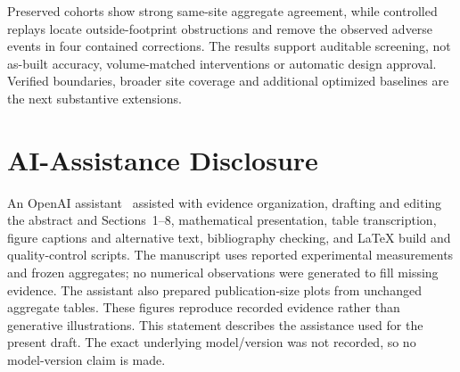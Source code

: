 \documentclass{llncs}
\begin{document}
Preserved cohorts show strong same-site aggregate agreement, while controlled replays locate outside-footprint obstructions and remove the observed adverse events in four contained corrections. The results support auditable screening, not as-built accuracy, volume-matched interventions or automatic design approval. Verified boundaries, broader site coverage and additional optimized baselines are the next substantive extensions.

\section*{AI-Assistance Disclosure}
An OpenAI assistant~\cite{openai2026} assisted with evidence organization, drafting and editing the abstract and Sections~1--8, mathematical presentation, table transcription, figure captions and alternative text, bibliography checking, and LaTeX build and quality-control scripts. The manuscript uses reported experimental measurements and frozen aggregates; no numerical observations were generated to fill missing evidence. The assistant also prepared publication-size plots from unchanged aggregate tables. These figures reproduce recorded evidence rather than generative illustrations. This statement describes the assistance used for the present draft. The exact underlying model/version was not recorded, so no model-version claim is made.

\FloatBarrier


\end{document}
